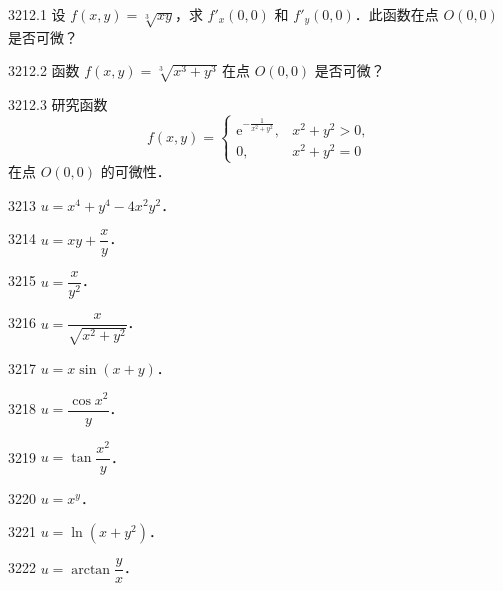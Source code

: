 \begin{prob}[M]{3212.1}
设 $f(x,y) = \sqrt[3]{xy}$，求 $f'_x(0,0)$ 和 $f'_y(0,0)$．此函数在点 $O(0,0)$ 是否可微？
\end{prob}

\begin{prob}[S]{3212.2}
函数 $f(x,y) = \sqrt[3]{x^3 + y^3}$ 在点 $O(0,0)$ 是否可微？
\end{prob}

\begin{prob}[M]{3212.3}
研究函数
\[
f(x,y) = \begin{cases} \mathrm{e}^{-\frac{1}{x^2+y^2}}, & x^2+y^2 > 0, \\ 0, & x^2+y^2 = 0 \end{cases}
\]
在点 $O(0,0)$ 的可微性．
\end{prob}


\begin{prob}[S]{3213}
$u = x^4 + y^4 - 4x^2 y^2$．
\end{prob}

\begin{prob}[S]{3214}
$u = xy + \dfrac{x}{y}$．
\end{prob}

\begin{prob}[S]{3215}
$u = \dfrac{x}{y^2}$．
\end{prob}

\begin{prob}[S]{3216}
$u = \dfrac{x}{\sqrt{x^2+y^2}}$．
\end{prob}

\begin{prob}[S]{3217}
$u = x\sin(x+y)$．
\end{prob}

\begin{prob}[S]{3218}
$u = \dfrac{\cos x^2}{y}$．
\end{prob}

\begin{prob}[S]{3219}
$u = \tan\dfrac{x^2}{y}$．
\end{prob}

\begin{prob}[S]{3220}
$u = x^y$．
\end{prob}

\begin{prob}[S]{3221}
$u = \ln(x+y^2)$．
\end{prob}

\begin{prob}[S]{3222}
$u = \arctan\dfrac{y}{x}$．
\end{prob}


